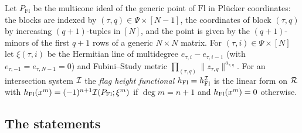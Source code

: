 \begin{definition}\label{pf:volthm:def:hh}
Let $P_{\mathrm{Fl}}$ be the multicone ideal of the generic point of $\mathrm{Fl}$ in Pl\"ucker coordinates:
the blocks are indexed by $(\tau,q)\in\Psi\times[N-1]$, the coordinates of block $(\tau,q)$ by increasing
$(q+1)$-tuples in $[N]$, and the point is given by the $(q+1)$-minors of the first $q+1$ rows of a generic
$N\times N$ matrix. For $(\tau,i)\in\Psi\times[N]$ let $\xi(\tau,i)$ be the Hermitian line of
multidegree $e_{\tau,i}-e_{\tau,i-1}$ (with $e_{\tau,-1}=e_{\tau,N-1}=0$) and Fubini--Study metric
$\prod_{(\tau,q)}\|z_{\tau,q}\|^{a_{\tau,q}}$. For an intersection system
$\mathcal{I}$ the \emph{flag height functional} $h_{\mathrm{Fl}}=h_{\mathrm{Fl}}^{\mathcal{I}}$ is the linear form on $\mathcal{R}$
with $h_{\mathrm{Fl}}(x^m)=(-1)^{n+1}\mathcal{I}(P_{\mathrm{Fl}};\xi^m)$ if $\deg m=n+1$ and $h_{\mathrm{Fl}}(x^m)=0$ otherwise.
\end{definition}

\subsection{The statements}\label{pf:volthm:sec:statements}

